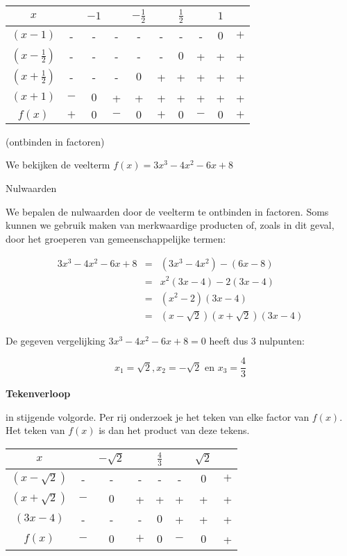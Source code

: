 \begin{voorbeeld}
\begin{center}
\begin{tabular}{c||ccccccccc}
$x$ &  & $-1$ &  & $-\frac{1}{2}$ &  & $\frac{1}{2}$ &  & $1$ & \\
\hline 
$(x-1)$ & - & - & - & - & - & - & - & $0$ & $+$\\
$(x-\frac{1}{2})$ & - & - & - & - & -  & $0$ & + & + & + \\
$(x+\frac{1}{2})$ & - & - & - & $0$ & + & + & + & + & + \\
$(x+1)$ & $-$ & $0$ & + & + & + & + & + & + & + \\
\hline 
$f(x)$ & $+$ & $0$ & $-$ & $0$ & $+$ & $0$ & $-$ & $0$ & $+$\\
\end{tabular}
\end{center}

\end{voorbeeld}

\begin{voorbeeld}
	(ontbinden in factoren)

We bekijken de veelterm $f(x)=3x^{3}-4x^{2}-6x+8$

Nulwaarden

We bepalen de nulwaarden door de veelterm te ontbinden in
factoren. Soms kunnen we gebruik maken van merkwaardige producten
of, zoals in dit geval, door het groeperen van gemeenschappelijke
termen:

\begin{eqnarray*}
3x^{3}-4x^{2}-6x+8 & = & (3x^{3}-4x^{2})-(6x-8)\\
 & = & x^{2}(3x-4)-2(3x-4)\\
 & = & (x^{2}-2)(3x-4)\\
 & = & (x-\sqrt{2})(x+\sqrt{2})(3x-4)
\end{eqnarray*}

 De gegeven vergelijking $3x^{3}-4x^{2}-6x+8=0$ heeft dus
3 nulpunten:

\begin{equation*}
x_{1}=\sqrt{2}, x_{2}=-\sqrt{2} \text{ en } x_{3}=\frac{4}{3}
\end{equation*}

\textbf{Tekenverloop}

in stijgende volgorde. Per rij onderzoek je het teken van elke factor
van $f(x)$. Het teken van $f(x)$ is dan het product van deze tekens.

\begin{center}
\begin{tabular}{c||ccccccc}
$x$ &  & $-\sqrt{2}$ &  & $\frac{4}{3}$ &  & $\sqrt{2}$ & \\
\hline 
$(x-\sqrt{2})$ & - & - & -& -& - & $0$ & $+$ \\
$(x+\sqrt{2})$ & $-$ & $0$ & + & + & +&+&+ \\
$(3x-4)$ & - & - & - & $0$ & +&+&+ \\
\hline 
$f(x)$ & $-$ & $0$ & $+$ & $0$ & $-$ & $0$ & + \\
\end{tabular}
\end{center}


\end{voorbeeld}


